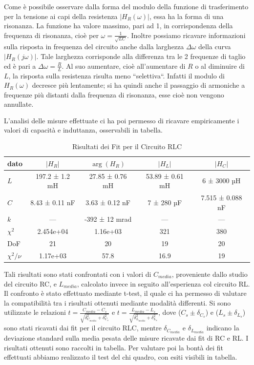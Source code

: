 \documentclass[a4paper]{article}
\begin{document}
Come è possibile osservare dalla forma del modulo della funzione di trasferimento per la tensione ai capi della resistenza $|H_R(\omega)|$, essa ha la forma di una risonanza. La funzione ha valore massimo, pari ad 1, in corrispondenza della frequenza di risonanza, cioè per $\omega = \frac{1}{\sqrt{LC}}$.
Inoltre possiamo ricavare informazioni sulla risposta in frequenza del circuito anche dalla larghezza $\Delta \omega$ della curva $|H_R(j\omega)|$. Tale larghezza corrisponde alla differenza tra le 2 frequenze di taglio ed è pari a $\Delta \omega = \frac{R}{L}$. Al suo aumentare, cioè all'aumentare di $R$ o al diminuire di $L$, la risposta sulla resistenza risulta meno “selettiva“.
Infatti il modulo di $H_R(\omega)$ decresce più lentamente; si ha quindi anche il passaggio di armoniche a frequenze più distanti dalla frequenza di risonanza, esse cioè non vengono annullate.

L'analisi delle misure effettuate ci ha poi permesso di ricavare empiricamente i valori di capacità e induttanza, osservabili in tabella.
\begin{table}[htbp]
\centering
\begin{tabular}{|l|cccc|}
\hline
dato & $|H_R|$ & $\arg(H_R)$ & $|H_L|$ & $|H_C|$ \\\hline\hline
$L$ & 197.2 ± 1.2 mH & 27.85 ± 0.76 mH & 53.89 ± 0.61 mH & 6 ± 3000 µH \\\hline
$C$ & 8.43 ± 0.11 nF & 3.63 ± 0.12 nF & 7 ± 280 µF & 7.515 ± 0.088 nF \\\hline
$k$ & --- & -392 ± 12 mrad & --- & --- \\\hline
$\chi^2$ & 2.454e+04 & 1.16e+03 & 321 & 380 \\\hline
DoF & 21 & 20 & 19 & 20 \\\hline
$\chi^2/\nu$ & 1.17e+03 & 57.8 & 16.9 & 19 \\\hline
\end{tabular}
\caption{Risultati dei Fit per il Circuito RLC}
\end{table}

Tali risultati sono stati confrontati con i valori di $C_{media}$, proveniente dallo studio del circuito RC, e $L_{media}$, calcolato invece in seguito all'esperienza col circuito RL. Il confronto è stato effettuato mediante t-test, il quale ci ha permesso di valutare la compatibilità tra i risultati ottenuti mediante modalità differenti. Si sono utilizzate le relazioni $ t = \frac{C_{media} - C_s}{\sqrt{\delta_{C_{media}}^2 + \delta_{C_s}^2}} $ e $ t = \frac{L_{media} - L_s}{\sqrt{\delta_{L_{media}}^2 + \delta_{L_s}^2}} $, dove ($C_s \pm \delta_{C_s}$) e ($L_s \pm \delta_{L_s}$) sono stati ricavati dai fit per il circuito RLC, mentre $\delta_{C_{media}}$ e $\delta_{L_{media}}$ indicano la deviazione standard sulla media pesata delle misure ricavate dai fit di RC e RL. I risultati ottenuti sono raccolti in tabella.
Per valutare poi la bontà dei fit effettuati abbiamo realizzato il test del chi quadro, con esiti visibili in tabella.
\end{document}
